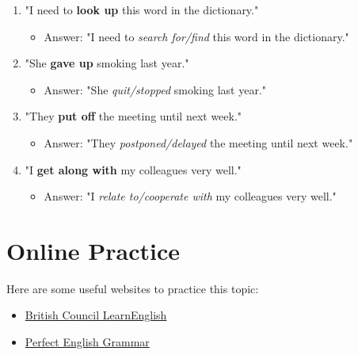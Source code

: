 \begin{enumerate}
    \item "I need to \textbf{look up} this word in the dictionary."
    \begin{itemize}
        \item Answer: "I need to \textit{search for/find} this word in the dictionary."
    \end{itemize}
    
    \item "She \textbf{gave up} smoking last year."
    \begin{itemize}
        \item Answer: "She \textit{quit/stopped} smoking last year."
    \end{itemize}
    
    \item "They \textbf{put off} the meeting until next week."
    \begin{itemize}
        \item Answer: "They \textit{postponed/delayed} the meeting until next week."
    \end{itemize}
    
    \item "I \textbf{get along with} my colleagues very well."
    \begin{itemize}
        \item Answer: "I \textit{relate to/cooperate with} my colleagues very well."
    \end{itemize}
\end{enumerate}


\section{Online Practice}
Here are some useful websites to practice this topic:
\begin{itemize}
    \item \href{https://learnenglish.britishcouncil.org/grammar/b1-b2-grammar/phrasal-verbs}{British Council LearnEnglish}
    \item \href{https://www.perfect-english-grammar.com/phrasal-verbs-exercises.html}{Perfect English Grammar}
\end{itemize}
